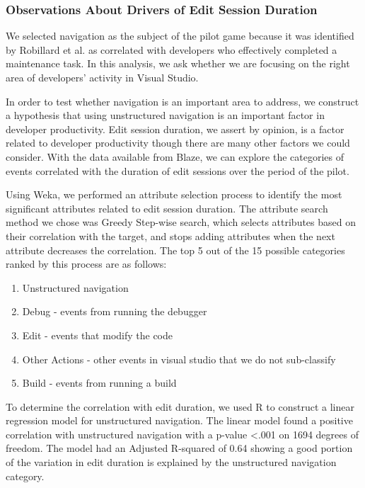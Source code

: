 \documentclass{sig-alternate}
\begin{document}
\subsubsection{Observations About Drivers of Edit Session Duration}

We selected navigation as the subject of the pilot game because it was identified by Robillard et al.\cite{wbsnipes:Robillard2004How} as correlated with developers who effectively completed a maintenance task.    In this analysis, we ask whether we are focusing on the right area of developers' activity in Visual Studio.

In order to test whether navigation is an important area to address, we construct a hypothesis that using unstructured navigation is an important factor in developer productivity.  Edit session duration, we assert by opinion, is a factor related to developer productivity though there are many other factors we could consider.  With the data available from Blaze, we can explore the categories of events correlated with the duration of edit sessions over the period of the pilot.  

Using Weka\cite{Hall2009WEKA}, we performed an attribute selection process to identify the most significant attributes related to edit session duration.  The attribute search method we chose was Greedy Step-wise search, which selects attributes based on their correlation with the target, and stops adding attributes when the next attribute decreases the correlation.    The top 5 out of the 15 possible categories ranked by this process are as follows:
\begin{enumerate}[itemsep=0mm]
\item Unstructured navigation
\item Debug - events from running the debugger
\item Edit - events that modify the code
\item Other Actions - other events in visual studio that we do not sub-classify
\item Build - events from running a build
\end{enumerate}

To determine the correlation with edit duration, we used R\cite{Rcitation} to construct a linear regression model for unstructured navigation.  The linear model found a positive correlation with unstructured navigation with a p-value <.001 on 1694 degrees of freedom.  The model had an Adjusted R-squared of 0.64 showing a good portion of the variation in edit duration is explained by the unstructured navigation category. 
\end{document}
